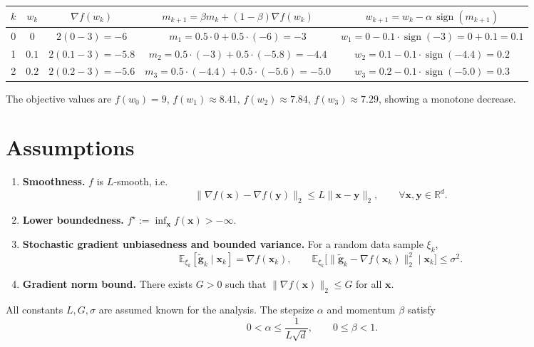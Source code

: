 \documentclass{article}
\newcommand{\sign}{\operatorname{sign}}
\newcommand{\E}{\mathbb{E}}
\newcommand{\R}{\mathbb{R}}
\begin{document}
\begin{center}
\begin{tabular}{c|c|c|c|c}
$k$ & $w_{k}$ & $\nabla f(w_{k})$ & $m_{k+1}= \beta m_{k}+(1-\beta)\nabla f(w_{k})$ & $w_{k+1}=w_{k}-\alpha\,\sign(m_{k+1})$ \\ \hline
0 & $0$ & $2(0-3)=-6$ & $m_{1}=0.5\cdot0+0.5\cdot(-6)=-3$ & $w_{1}=0-0.1\cdot\sign(-3)=0+0.1=0.1$\\[4pt]
1 & $0.1$ & $2(0.1-3)=-5.8$ & $m_{2}=0.5\cdot(-3)+0.5\cdot(-5.8)=-4.4$ & $w_{2}=0.1-0.1\cdot\sign(-4.4)=0.2$\\[4pt]
2 & $0.2$ & $2(0.2-3)=-5.6$ & $m_{3}=0.5\cdot(-4.4)+0.5\cdot(-5.6)=-5.0$ & $w_{3}=0.2-0.1\cdot\sign(-5.0)=0.3$
\end{tabular}
\end{center}

The objective values are $f(w_{0})=9$, $f(w_{1})\approx8.41$, $f(w_{2})\approx7.84$, $f(w_{3})\approx7.29$, showing a monotone decrease.

\newpage
\section*{Assumptions}
\begin{enumerate}[label=(A\arabic*)]
\item \textbf{Smoothness.} $f$ is $L$‑smooth, i.e.
\[
\|\nabla f(\bm{x})-\nabla f(\bm{y})\|_{2}\le L\|\bm{x}-\bm{y}\|_{2},\qquad\forall\bm{x},\bm{y}\in\R^{d}. \tag{A1}
\]

\item \textbf{Lower boundedness.} $f^{\star}:=\inf_{\bm{x}}f(\bm{x})>-\infty$. 

\item \textbf{Stochastic gradient unbiasedness and bounded variance.} For a random data sample $\xi_{k}$,
\[
\E_{\xi_{k}}[\tilde{\bm{g}}_{k}\mid\bm{x}_{k}]=\nabla f(\bm{x}_{k}),\qquad
\E_{\xi_{k}}\!\big[\|\tilde{\bm{g}}_{k}-\nabla f(\bm{x}_{k})\|_{2}^{2}\mid\bm{x}_{k}\big]\le\sigma^{2}. \tag{A3}
\]

\item \textbf{Gradient norm bound.} There exists $G>0$ such that $\|\nabla f(\bm{x})\|_{2}\le G$ for all $\bm{x}$. 
\end{enumerate}

All constants $L,G,\sigma$ are assumed known for the analysis. The stepsize $\alpha$ and momentum $\beta$ satisfy
\[
0<\alpha\le\frac{1}{L\sqrt{d}},\qquad 0\le\beta<1. \tag{A5}
\]
\end{document}
